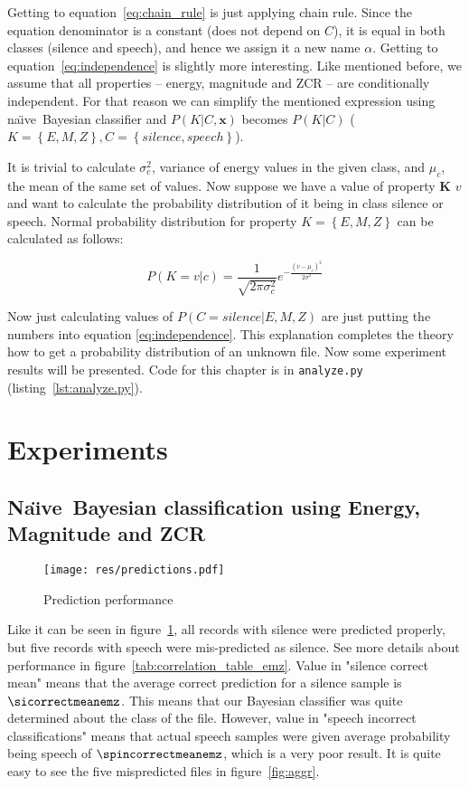 \documentclass[english,11pt]{article}
\numberwithin{equation}{section}
\newcommand{\naive}{na\"{\i}ve\ }
\newcommand{\Naive}{Na\"{\i}ve\ }
\begin{document}
Getting to equation~\ref{eq:chain_rule} is just applying chain rule. Since the
equation denominator is a constant (does not depend on $C$), it is equal in
both classes (silence and speech), and hence we assign it a new name $\alpha$.
Getting to equation~\ref{eq:independence} is slightly more interesting. Like
mentioned before, we assume that all properties -- energy, magnitude and ZCR --
are conditionally independent. For that reason we can simplify the mentioned
expression using \naive Bayesian classifier and $P(K | C, \mathbf{x})$ becomes
$P(K|C)$ ($K = \left\{E, M, Z\right\}, C = \left\{ silence, speech \right\}$).

It is trivial to calculate $\sigma_{c}^{2}$, variance of energy values in the
given class, and $\mu_{c}$, the mean of the same set of values. Now suppose we
have a value of property $\textbf{K}$ $v$ and want to calculate the probability
distribution of it being in class silence or speech. Normal probability
distribution for property $K = \left\{E, M, Z\right\}$ can be calculated as
follows:

$$
P(K = v|c) = \frac{1}{\sqrt{2 \pi \sigma_{c}^{2}}}
e ^{- \frac{ (v - \mu_{c})^2 }{2 \sigma^2} }
$$

Now just calculating values of $P(C=silence| E, M, Z)$ are just putting the
numbers into equation \ref{eq:independence}. This explanation completes the
theory how to get a probability distribution of an unknown file. Now some
experiment results will be presented. Code for this chapter is in
\texttt{analyze.py} (listing~\ref{lst:analyze.py}).

\section{Experiments}

\subsection{\Naive Bayesian classification using Energy, Magnitude and ZCR}

\begin{figure}
    \centering
    \texttt{[image: res/predictions.pdf]}
    \caption{Prediction performance}
    \label{fig:simple_performance}
\end{figure}

Like it can be seen in figure~\ref{fig:simple_performance}, all records with
silence were predicted properly, but five records with speech were
mis-predicted as silence. See more details about performance in
figure~\ref{tab:correlation_table_emz}. Value in "silence correct mean" means
that the average correct prediction for a silence sample is
$\sicorrectmeanemz$. This means that our Bayesian classifier was quite
determined about the class of the file. However, value in "speech incorrect
classifications" means that actual speech samples were given average
probability being speech of $\spincorrectmeanemz$, which is a very poor result.
It is quite easy to see the five mispredicted files in figure~\ref{fig:aggr}.
\end{document}
